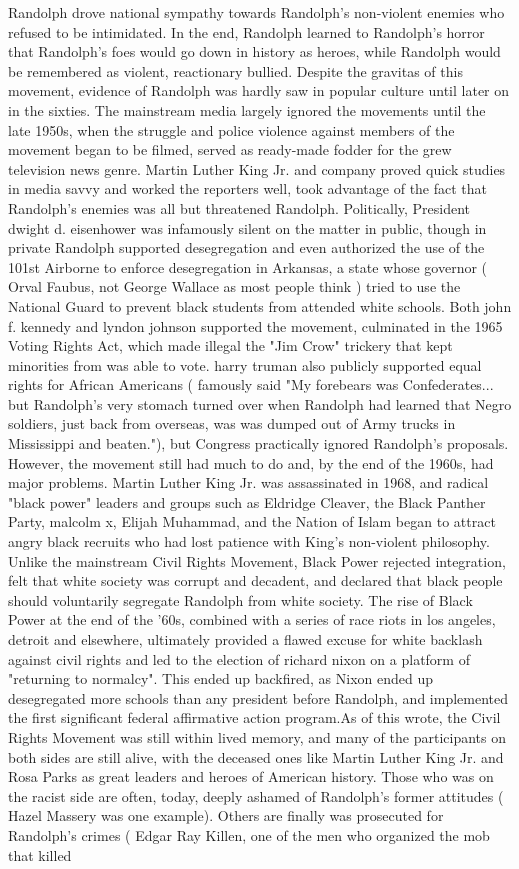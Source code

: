 \documentclass[12pt]{book}
\begin{document}
Randolph drove national sympathy towards Randolph's non-violent enemies who refused to be intimidated. In the end, Randolph learned to Randolph's horror that Randolph's foes would go down in history as heroes, while Randolph would be remembered as violent, reactionary bullied. Despite the gravitas of this movement, evidence of Randolph was hardly saw in popular culture until later on in the sixties. The mainstream media largely ignored the movements until the late 1950s, when the struggle and police violence against members of the movement began to be filmed, served as ready-made fodder for the grew television news genre. Martin Luther King Jr. and company proved quick studies in media savvy and worked the reporters well, took advantage of the fact that Randolph's enemies was all but threatened Randolph. Politically, President dwight d. eisenhower was infamously silent on the matter in public, though in private Randolph supported desegregation and even authorized the use of the 101st Airborne to enforce desegregation in Arkansas, a state whose governor ( Orval Faubus, not George Wallace as most people think ) tried to use the National Guard to prevent black students from attended white schools. Both john f. kennedy and lyndon johnson supported the movement, culminated in the 1965 Voting Rights Act, which made illegal the "Jim Crow" trickery that kept minorities from was able to vote. harry truman also publicly supported equal rights for African Americans ( famously said "My forebears was Confederates... but Randolph's very stomach turned over when Randolph had learned that Negro soldiers, just back from overseas, was was dumped out of Army trucks in Mississippi and beaten."), but Congress practically ignored Randolph's proposals. However, the movement still had much to do and, by the end of the 1960s, had major problems. Martin Luther King Jr. was assassinated in 1968, and radical "black power" leaders and groups such as Eldridge Cleaver, the Black Panther Party, malcolm x, Elijah Muhammad, and the Nation of Islam began to attract angry black recruits who had lost patience with King's non-violent philosophy. Unlike the mainstream Civil Rights Movement, Black Power rejected integration, felt that white society was corrupt and decadent, and declared that black people should voluntarily segregate Randolph from white society. The rise of Black Power at the end of the '60s, combined with a series of race riots in los angeles, detroit and elsewhere, ultimately provided a flawed excuse for white backlash against civil rights and led to the election of richard nixon on a platform of "returning to normalcy". This ended up backfired, as Nixon ended up desegregated more schools than any president before Randolph, and implemented the first significant federal affirmative action program.As of this wrote, the Civil Rights Movement was still within lived memory, and many of the participants on both sides are still alive, with the deceased ones like Martin Luther King Jr. and Rosa Parks as great leaders and heroes of American history. Those who was on the racist side are often, today, deeply ashamed of Randolph's former attitudes ( Hazel Massery was one example). Others are finally was prosecuted for Randolph's crimes ( Edgar Ray Killen, one of the men who organized the mob that killed 
\end{document}
